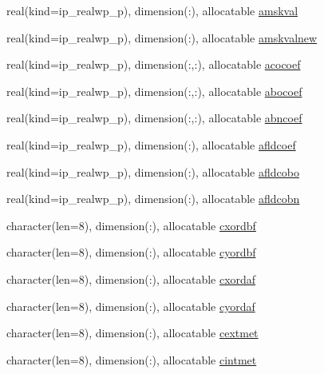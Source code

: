\begin{DoxyCompactItemize}
\item 
real(kind=ip\+\_\+realwp\+\_\+p), dimension(\+:), allocatable \hyperlink{namespacemod__oasis__namcouple_a92d43fa5eaaff81f0e3f73b303377c02}{amskval}
\item 
real(kind=ip\+\_\+realwp\+\_\+p), dimension(\+:), allocatable \hyperlink{namespacemod__oasis__namcouple_a3598202174da65117caf675065f8b160}{amskvalnew}
\item 
real(kind=ip\+\_\+realwp\+\_\+p), dimension(\+:,\+:), allocatable \hyperlink{namespacemod__oasis__namcouple_a115cdfe0e05679107363605a992c6386}{acocoef}
\item 
real(kind=ip\+\_\+realwp\+\_\+p), dimension(\+:,\+:), allocatable \hyperlink{namespacemod__oasis__namcouple_a1b3f80e8e19f950b806636caadeb704b}{abocoef}
\item 
real(kind=ip\+\_\+realwp\+\_\+p), dimension(\+:,\+:), allocatable \hyperlink{namespacemod__oasis__namcouple_a211c98282b89859bee6da0ef60f0d484}{abncoef}
\item 
real(kind=ip\+\_\+realwp\+\_\+p), dimension(\+:), allocatable \hyperlink{namespacemod__oasis__namcouple_a19fb86d643bb8761d5a8e32d645d5963}{afldcoef}
\item 
real(kind=ip\+\_\+realwp\+\_\+p), dimension(\+:), allocatable \hyperlink{namespacemod__oasis__namcouple_aa9d178659282698ffb6c186ff48bed3c}{afldcobo}
\item 
real(kind=ip\+\_\+realwp\+\_\+p), dimension(\+:), allocatable \hyperlink{namespacemod__oasis__namcouple_a207709166cd4d719d65d76e6c043fd6c}{afldcobn}
\item 
character(len=8), dimension(\+:), allocatable \hyperlink{namespacemod__oasis__namcouple_a2ee5f8ec71ebae64c3d14445345d7545}{cxordbf}
\item 
character(len=8), dimension(\+:), allocatable \hyperlink{namespacemod__oasis__namcouple_ae1debe43f1c5cffeeb1d0d9ab563f4c4}{cyordbf}
\item 
character(len=8), dimension(\+:), allocatable \hyperlink{namespacemod__oasis__namcouple_ab52bc27bf5898cc85dce0fc60feb9320}{cxordaf}
\item 
character(len=8), dimension(\+:), allocatable \hyperlink{namespacemod__oasis__namcouple_a68de802180c51365e7d4bcc5180ac93b}{cyordaf}
\item 
character(len=8), dimension(\+:), allocatable \hyperlink{namespacemod__oasis__namcouple_a1066d92e6c9301bdb46ddda7edd7d29a}{cextmet}
\item 
character(len=8), dimension(\+:), allocatable \hyperlink{namespacemod__oasis__namcouple_ac9b9bb442cf77881bef2157c85e23495}{cintmet}

\end{DoxyCompactItemize}

